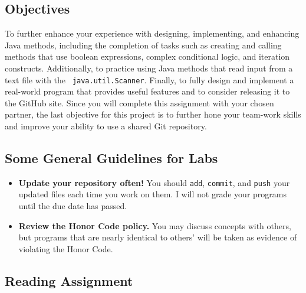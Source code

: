 


\vspace{-0.2in}
\subsection*{Objectives}
\vspace{-0.05in}

To further enhance your experience with designing, implementing, and enhancing Java methods, including the completion of
tasks such as creating and calling methods that use boolean expressions, complex conditional logic, and iteration
constructs.  Additionally, to practice using Java methods that read input from a text file with the {\tt
java.util.Scanner}. Finally, to fully design and implement a real-world program that provides useful features and to
consider releasing it to the GitHub site. Since you will complete this assignment with your chosen partner, the last
objective for this project is to further hone your team-work skills and improve your ability to use a shared Git
repository.

\vspace{-0.15in}
\subsection*{Some General Guidelines for Labs}
\vspace{-0.05in}

\begin{itemize}

\item {\bf Update your repository often!} You should {\tt add}, {\tt commit}, and {\tt push} your updated files each
  time you work on them.  I will not grade your programs until the due date has passed.

\item {\bf Review the Honor Code policy.} You may discuss concepts with others, but programs that are nearly identical
  to others' will be taken as evidence of violating the Honor Code.

\end{itemize}

\vspace{-0.25in}
\subsection*{Reading Assignment}
\vspace{-0.05in}

